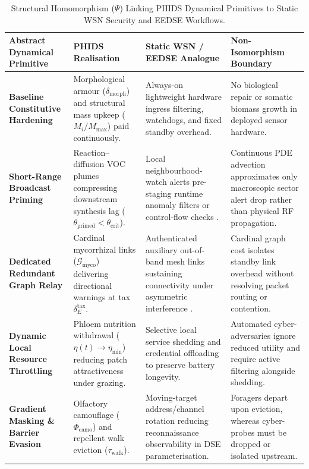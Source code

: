 
\begin{table}[b]
\caption{Structural Homomorphism ($\Psi$) Linking PHIDS Dynamical Primitives to Static WSN Security and EEDSE Workflows.}
\label{tab:wsn_protocol_translation}
\vspace{4pt}
\centering
\footnotesize
\begin{tabularx}{\textwidth}{
  >{\raggedright\hsize=0.95\hsize}X
  >{\raggedright\hsize=1.05\hsize}X
  >{\raggedright\hsize=1.05\hsize}X
  >{\raggedright\arraybackslash\hsize=1.15\hsize}X
}
\toprule
\textbf{Abstract Dynamical Primitive} &
\textbf{PHIDS Realisation} &
\textbf{Static WSN / EEDSE Analogue} &
\textbf{Non-Isomorphism Boundary} \\
\midrule
\textbf{Baseline Constitutive Hardening} &
Morphological armour ($\delta_{\mathrm{morph}}$) and structural mass upkeep ($M_i / M_{\max}$) paid continuously. &
Always-on lightweight hardware ingress filtering, watchdogs, and fixed standby overhead. &
No biological repair or somatic biomass growth in deployed sensor hardware. \\
\midrule
\textbf{Short-Range Broadcast Priming} &
Reaction--diffusion VOC plumes compressing downstream synthesis lag ($\theta_{\mathrm{primed}} < \theta_{\mathrm{crit}}$). &
Local neighbourhood-watch alerts pre-staging runtime anomaly filters or control-flow checks \cite{forster2024determining}. &
Continuous PDE advection approximates only macroscopic sector alert drop rather than physical RF propagation. \\
\midrule
\textbf{Dedicated Redundant Graph Relay} &
Cardinal mycorrhizal links ($\mathcal{G}_{\text{myco}}$) delivering directional warnings at tax $\delta_E^{\mathrm{tax}}$. &
Authenticated auxiliary out-of-band mesh links sustaining connectivity under asymmetric interference \cite{forster2024topology}. &
Cardinal graph cost isolates standby link overhead without resolving packet routing or contention. \\
\midrule
\textbf{Dynamic Local Resource Throttling} &
Phloem nutrition withdrawal ($\eta(t) \to \eta_{\min}$) reducing patch attractiveness under grazing. &
Selective local service shedding and credential offloading to preserve battery longevity. &
Automated cyber-adversaries ignore reduced utility and require active filtering alongside shedding. \\
\midrule
\textbf{Gradient Masking \& Barrier Evasion} &
Olfactory camouflage ($\Phi_{\mathrm{camo}}$) and repellent walk eviction ($\tau_{\mathrm{walk}}$). &
Moving-target address/channel rotation reducing reconnaissance observability in DSE parameterisation. &
Foragers depart upon eviction, whereas cyber-probes must be dropped or isolated upstream. \\
\bottomrule
\end{tabularx}
\end{table}
